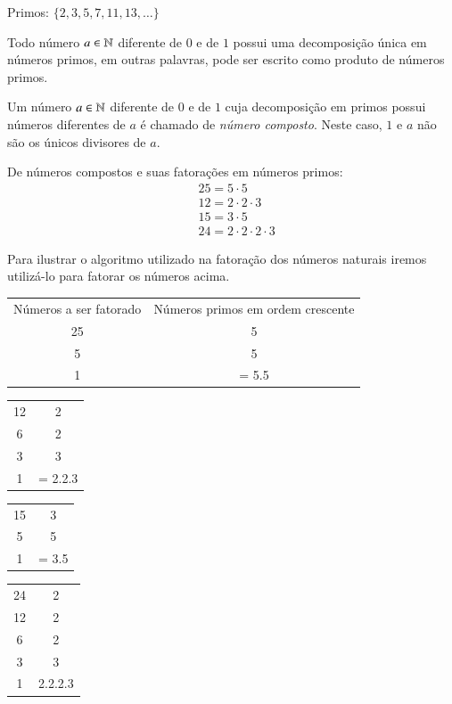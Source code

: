  \begin{exem}
 Primos: $\{2, 3, 5, 7, 11, 13, \ldots \}$
 \end{exem}

 \begin{teo}
 Todo número $a \in \mathbb{N}$ diferente de $0$ e de $1$ possui uma decomposição única em números primos, em outras palavras, pode ser escrito como produto de números primos.
 \end{teo}

 \begin{defi}
 Um número $a \in \mathbb{N}$ diferente de $0$ e de $1$ cuja decomposição em primos possui números diferentes de $a$ é chamado de \emph{número composto}. Neste caso, $1$ e $a$ não são os únicos divisores de $a$.
 \end{defi}

 \begin{exem} De números compostos e suas fatorações em números primos:
 \begin{align*}
 &25= 5 \cdot 5 \\
 &12= 2 \cdot 2 \cdot 3 \\
 &15= 3 \cdot 5 \\
 &24= 2 \cdot 2 \cdot 2 \cdot 3
 \end{align*}
 \end{exem}

 Para ilustrar o algoritmo utilizado na fatoração dos números naturais iremos utilizá-lo para fatorar os números acima.

 \begin{tabular}{c|c}
  Números a ser fatorado & Números primos em ordem crescente \\
  25 & 5 \\
  5  & 5 \\
  1  & = 5.5  \\
 \end{tabular}

 \begin{multicols}{3}
   \begin{tabular}{c|c}
  12 & 2 \\
   6 & 2 \\
   3 & 3 \\
   1 & = 2.2.3 \\
 \end{tabular}

 \begin{tabular}{c|c}
  15 & 3 \\
   5 & 5 \\
   1 & = 3.5 \\
 \end{tabular}

 \begin{tabular}{c|c}
  24 & 2 \\
  12 & 2 \\
   6 & 2 \\
   3 & 3 \\
   1 & 2.2.2.3 \\
 \end{tabular}
 \end{multicols}

